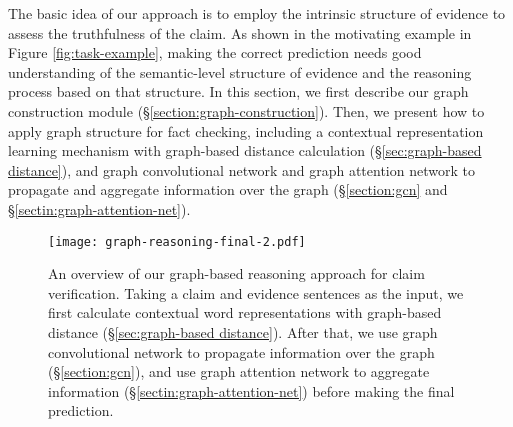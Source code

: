 \documentclass[11pt,a4paper]{article}
\begin{document}
The basic idea of our approach is to employ the intrinsic structure of evidence to assess the truthfulness of the claim.
As shown in the motivating example in Figure \ref{fig:task-example}, making the correct prediction needs good understanding of the semantic-level structure of evidence and the reasoning process based on that structure.
In this section, we first describe our graph construction module (\S \ref{section:graph-construction}).
Then, we present how to apply graph structure for fact checking, including a contextual representation learning mechanism with graph-based distance calculation (\S \ref{sec:graph-based distance}), and  graph convolutional network and graph attention network to propagate and aggregate information over the graph (\S \ref{section:gcn} and \S \ref{sectin:graph-attention-net}). 








\begin{figure*}[t]
	\texttt{[image: graph-reasoning-final-2.pdf]}
	\caption{An overview of our graph-based reasoning approach for claim verification. Taking a claim and evidence sentences as the input, we first calculate contextual word representations with graph-based distance (\S \ref{sec:graph-based distance}). After that, we use graph convolutional network to propagate information over the graph (\S \ref{section:gcn}), and use graph attention network to aggregate information (\S \ref{sectin:graph-attention-net}) before making the final prediction.}
	\label{fig:pipeline}
\end{figure*}
\end{document}
